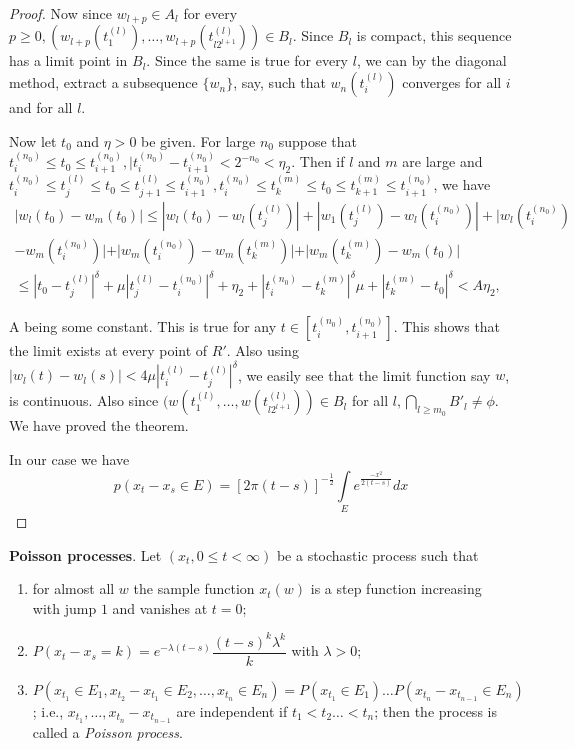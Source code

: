 \begin{proof}
Now since $w_{l+p} \in A_l$ for every $p \geq 0, (w_{l+p}(t^{(l)}_{1})
, \ldots , w_{l+p}(t^{(l)}_{l2^{l+1}})) \in B_l$. Since $B_l$ is
compact, this sequence has a limit point in $B_l$. Since the same is
true for every $l$, we can by the diagonal method, extract a
subsequence $\{w_n\}$, say, such that $w_n(t^{(l)}_{i})$ converges
for all $i$ and for all $l$. 

Now let $t_0$ and $\eta > 0$ be given. For large $n_0$ suppose
that\pageoriginale 
$t^{(n_0)}_{i} \leq t_0 \leq t^{(n_0)}_{i+1}, | t^{(n_0)}_{i} -
t^{(n_0)}_{i+1} < 2^{-n_0}< \eta_2$. Then if $l$ and $m$ are large and
$t^{(n_0)}_{i} \leq t^{(l)}_{j} \leq t_0 \leq t^{(l)}_{j+1} \leq
t^{(n_0)}_{i+1}, t^{(n_0)}_{i} \leq t^{(m)}_{k} \leq t_0 \leq
t^{(m)}_{k+1} \leq t^{(n_0)}_{i+1}$, we have  
\begin{align*}
|w_l (t_0) - w_m (t_0) | \leq | w_l (t_0) - w_l(t^{(l)}_{j}) | + |
  w_1 (t^{(l)}_{j})- w_l(t^{(n_0)}_{i}) |+| w_l (t^{(n_0)}_{i})\\ 
  - w_m(t^{(n_0)}_{i})| 
  + |w_m(t^{(n_0)}_{i}) -w_m(t^{(m)}_{k})|+| w_m(t^{(m)}_{k})
  -w_m(t_0)|\\ 
  \leq |t_0 -t^{(l)}_{j}|^{\delta} + \mu| t^{(l)}_{j}- t^{(n_0)}_{i}
  |^{\delta}+ \eta_2 + |t^{(n_0)}_{i}-t^{(m)}_{k}|^{\delta} \mu + |
  t^{(m)}_{k}-t_0|^{\delta} < A \eta_2, 
\end{align*}

A being some constant. This is true for any $t \in [t^{(n_0)}_{i},
  t^{(n_0)}_{i+1}]$. This shows that the limit exists at every point
of $R'$. Also using $|w_l(t) - w_l(s) | < 4 \mu|t^{(l)}_{i}-
t^{(l)}_{j} |^{\delta}$, we easily see that the limit function say
$w$, is continuous. Also since $(w(t^{(l)}_{1}, \ldots,
w(t^{(l)}_{l2^{l+1}})) \in B_l$ for all $l, \bigcap\limits_{l \geq
  m_0} B'_l \neq \phi$. We have proved the theorem. 

In our case we have 
$$
p(x_t- x_s \in E) = [2 \pi (t-s) ]^{-\frac{1}{2}} \int\limits_E
e^{\frac{-x^2}{2(t-s)}} dx 
$$
\end{proof}

\smallskip
\noindent
\textbf{Poisson processes}. 
Let $(x_t, 0 \leq t < \infty)$ be a stochastic process such
that\pageoriginale   
\begin{enumerate}
\item for almost all $w$ the sample function  
$x_{t}(w)$ is a step function
increasing with jump $1$
  and vanishes at $t = 0$; 
 
\item $P(x_t - x_s = k) = e^{ -\lambda (t - s)} \dfrac{(t -s)^k
  \lambda^k}{k}$ with $\lambda > 0$;  

\item $P(x_{t_1} \in E_1 , x_{t_2} - x_{t_1} \in E_2 , \ldots ,
  x_{t_n} \in E_n ) = P(x_{t _1} \in E_1) \ldots  P(x_{t_n} - x_{t_{n-1}}
  \in E_n)$; i.e., $x_{t_1},\ldots,x_{t_n} - x_{t_{n - 1}}$ are
  independent if $t_1 < t_2 \ldots < t_n$; then the process is called
  a \textit{Poisson process}.  
\end{enumerate}
